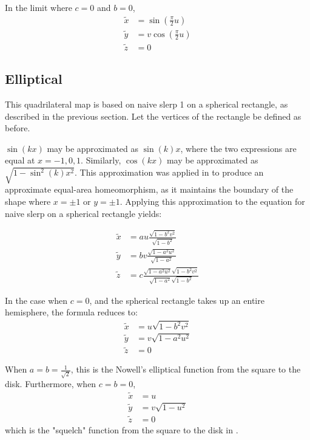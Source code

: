 \documentclass{amsart}[12pt]
\begin{document}
In the limit where $c=0$ and $b = 0$,
\begin{equation}\begin{split}
  \widetilde{x} &= \sin(\frac{\pi}{2}u) \\
  \widetilde{y} &= v \cos(\frac{\pi}{2}u) \\
  \widetilde{z} &= 0
\end{split}\end{equation}

\subsection{Elliptical}
This quadrilateral map is based on naive slerp 1 on a spherical rectangle, as
described in the previous section. Let the vertices of the rectangle be defined
as before.

$\sin(k x)$ may be approximated as $\sin(k)x$, where the two expressions are
equal at $x=-1,0,1$. Similarly, $\cos(k x)$ may be approximated as
$\sqrt{1 - \sin^2(k) x^2}$. This approximation was applied in \cite{reynolds} to
produce an approximate equal-area homeomorphism, as it maintains the boundary
of the shape where $x=\pm1$ or $y=\pm1$. Applying this approximation
to the equation for naive slerp on a spherical rectangle yields:

\begin{equation}\begin{split}\label{eq:elliptical}
  \widetilde{x} &= au \frac{\sqrt{1-b^2 v^2} }
    {\sqrt{1-b^2}}\\
  \widetilde{y} &= bv \frac{\sqrt{1-a^2 u^2} }
    {\sqrt{1-a^2}}\\
  \widetilde{z} &=c \frac{\sqrt{1-a^2 u^2}\sqrt{1-b^2 v^2} }
    {\sqrt{1-a^2}\sqrt{1-b^2}}
\end{split}\end{equation}

In the case when $c=0$, and the spherical rectangle takes up an entire
hemisphere, the formula reduces to:
\begin{equation}\begin{split}
  \widetilde{x} &= u \sqrt{1-b^2 v^2} \\
  \widetilde{y} &= v \sqrt{1-a^2 u^2} \\
  \widetilde{z} &= 0
\end{split}\end{equation}

When $a=b=\frac{1}{\sqrt{2}}$, this is the Nowell's elliptical function from
the square to the disk.\cite{nowellsq}\cite{fong17} Furthermore, when $c=b=0$,
\begin{equation}\begin{split}
  \widetilde{x} &= u  \\
  \widetilde{y} &= v \sqrt{1 - u^2} \\
  \widetilde{z} &= 0
\end{split}\end{equation}
which is the "squelch" function from the square to the disk in \cite{fong17}.
\end{document}
